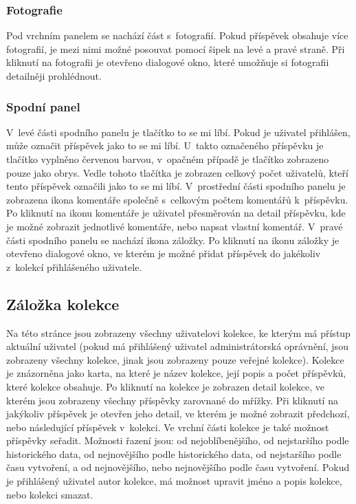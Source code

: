 \documentclass[12pt, a4paper,
  oneside,      %
]{report}
\begin{document}
\subsubsection{Fotografie}
Pod vrchním panelem se nachází část s~fotografií. Pokud příspěvek obsahuje více fotografií, je mezi nimi možné posouvat pomocí šipek na levé a pravé straně. Při kliknutí na fotografii je otevřeno dialogové okno, které umožňuje si fotografii detailněji prohlédnout. 
\subsubsection{Spodní panel}
V~levé části spodního panelu je tlačítko to se mi líbí. Pokud je uživatel přihlášen, může označit příspěvek jako to se mi líbí. U~takto označeného příspěvku je tlačítko vyplněno červenou barvou, v~opačném případě je tlačítko zobrazeno pouze jako obrys. Vedle tohoto tlačítka je zobrazen celkový počet uživatelů, kteří tento příspěvek označili jako to se mi líbí. V~prostřední části spodního panelu je zobrazena ikona komentáře společně s~celkovým počtem komentářů k~příspěvku. Po kliknutí na ikonu komentáře je uživatel přesměrován na detail příspěvku, kde je možné zobrazit jednotlivé komentáře, nebo napsat vlastní komentář. V~pravé části spodního panelu se nachází ikona záložky. Po kliknutí na ikonu záložky je otevřeno dialogové okno, ve kterém je možné přidat příspěvek do jakékoliv z~kolekcí přihlášeného uživatele.
\subsection{Záložka kolekce}
Na této stránce jsou zobrazeny všechny uživatelovi kolekce, ke kterým má přístup aktuální uživatel (pokud má přihlášený uživatel administrátorská oprávnění, jsou zobrazeny všechny kolekce, jinak jsou zobrazeny pouze veřejné kolekce). Kolekce je znázorněna jako karta, na které je název kolekce, její popis a počet příspěvků, které kolekce obsahuje. Po kliknutí na kolekce je zobrazen detail kolekce, ve kterém jsou zobrazeny všechny příspěvky zarovnané do mřížky. Při kliknutí na jakýkoliv příspěvek je otevřen jeho detail, ve kterém je možné zobrazit předchozí, nebo následující příspěvek v~kolekci. Ve vrchní části kolekce je také možnost příspěvky seřadit. Možnosti řazení jsou: od nejoblíbenějšího, od nejstaršího podle historického data, od nejnovějšího podle historického data, od nejstaršího podle času vytvoření, a od nejnovějšího, nebo nejnovějšího podle času vytvoření. Pokud je přihlášený uživatel autor kolekce, má možnost upravit jméno a popis kolekce, nebo kolekci smazat.
\end{document}
